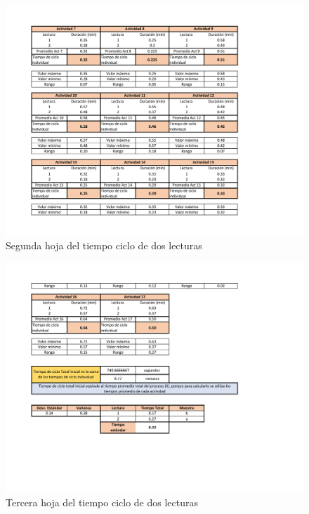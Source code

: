     \begin{figure}[H]
        \centering
        \includegraphics[trim = {1mm 1mm 1mm 1mm},clip,scale=0.45]{34/img/tiempoCicloEnsamble2Lecturas2.pdf}
        \caption{Segunda hoja del tiempo ciclo de dos lecturas}
        \label{fig:tiempoCicloEnsamble2Lecturas2}
    \end{figure}
    
    \begin{figure}[H]
        \centering
        \includegraphics[trim = {1mm 1mm 1mm 1mm},clip,scale=0.45]{34/img/tiempoCicloEnsamble2Lecturas3.pdf}
        \caption{Tercera hoja del tiempo ciclo de dos lecturas}
        \label{fig:tiempoCicloEnsamble2Lecturas3}
    \end{figure}
    
